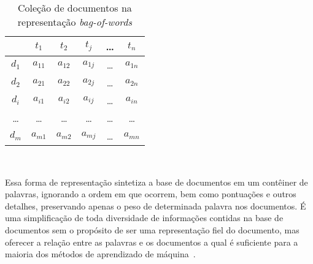\begin{table}[!h]
	\centering

	\begin{tabular}{|c|c|c|c|c|c|}

	\hline
	    & $t_1$      & $t_2$     & $t_j$    & \dots & $t_n$      \\ \hline
	$d_1$ & $a_{11}$ & $a_{12}$  & $a_{1j}$ & \dots & $a_{1n}$   \\ \hline 
	$d_2$ & $a_{21}$ & $a_{22}$  & $a_{2j}$ & \dots & $a_{2n}$   \\ \hline 
	$d_i$ & $a_{i1}$ & $a_{i2}$  & $a_{ij}$ & \dots & $a_{in}$   \\ \hline 
	\dots & \dots    & \dots     & \dots    & \dots & \dots      \\ \hline 
	$d_m$ & $a_{m1}$ & $a_{m2}$  & $a_{mj}$ & \dots & $a_{mn}$   \\ \hline 

	\end{tabular}

	\caption{Coleção de documentos na representação \textit{bag-of-words}}
	\label{table:bagofwords}\\ 
\end{table}


Essa forma de representação sintetiza a base de documentos em um contêiner de palavras, ignorando a ordem em que ocorrem, bem como pontuações e outros detalhes, preservando apenas o peso de determinada palavra nos documentos. É uma simplificação de toda diversidade de informações contidas na base de documentos sem o propósito de ser uma representação fiel do documento, mas oferecer a relação entre as palavras e os documentos a qual é suficiente para a maioria dos métodos de aprendizado de máquina~\cite{Rezende2003}. 







